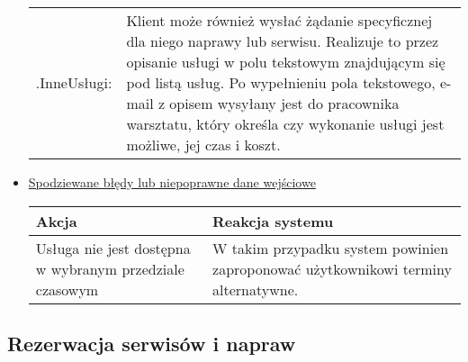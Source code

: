 \documentclass[a4paper,20pt]{article}
\begin{document}
\begin{itemize}
\begin{center}
\begin{tabularx}{\textwidth}[t]{XX}
\quad .InneUsługi: & 
\begin{minipage}[t]{\linewidth}%
Klient może również wysłać żądanie specyficznej dla niego naprawy lub serwisu. Realizuje to przez opisanie usługi w polu tekstowym znajdującym się pod listą usług. Po wypełnieniu pola tekstowego, e-mail z opisem wysyłany jest do pracownika warsztatu, który określa czy wykonanie usługi jest możliwe, jej czas i koszt. 
\end{minipage}\\


\end{tabularx}
\end{center}


\item \underline{Spodziewane błędy lub niepoprawne dane wejściowe}


\begin{center}
\begin{tabular}{ | m{15em} | m{7cm} | } 
\hline
\textbf{Akcja} & \textbf{Reakcja systemu} \\ 
\hline
Usługa nie jest dostępna w wybranym przedziale czasowym & W takim przypadku system powinien zaproponować użytkownikowi terminy alternatywne.  \\ 
\hline
\end{tabular}
\end{center}

\end{itemize}





\subsection{Rezerwacja serwisów i napraw}
\end{document}
